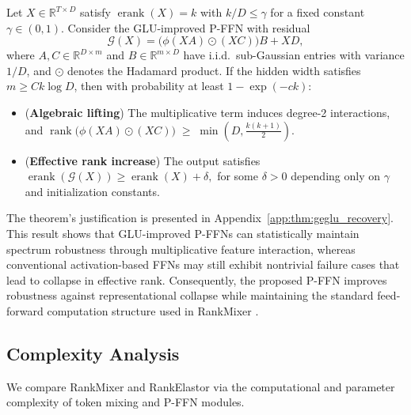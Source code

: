 \documentclass[sigconf,screen]{acmart}
\newcommand{\unimixer}{RankElastor }
\newcommand{\rankmixer}{RankMixer }
\begin{document}
\begin{theorem}
\label{thm:geglu_recovery}
Let $X\in\mathbb R^{T\times D}$ satisfy $\operatorname{erank}(X)=k$ with $k/D\le \gamma$ for a fixed constant $\gamma\in(0,1)$.  
Consider the GLU-improved P-FFN with residual
\[
\mathcal G(X)=\big(\phi(XA)\odot(XC)\big)B + XD,
\]
where $A,C\in\mathbb R^{D\times m}$ and $B\in\mathbb R^{m\times D}$ have i.i.d.\ sub-Gaussian entries with variance $1/D$, and $\odot$ denotes the Hadamard product. 
If the hidden width satisfies $m \ge C k\log D$, then with probability at least $1-\exp(-c k)$:
\begin{itemize}[leftmargin=15pt,parsep=2pt,itemsep=2pt,topsep=2pt]
    \item (\textbf{Algebraic lifting})  
    The multiplicative term induces degree-2 interactions, and
    \(
    \operatorname{rank}\!\big(\phi(XA)\odot(XC)\big)\;\ge\;\min\!\left(D,\frac{k(k+1)}{2}\right).
    \)
    \item (\textbf{Effective rank increase})  
    The output satisfies
    \(
    \operatorname{erank}(\mathcal G(X)) \ge \operatorname{erank}(X) + \delta,
    \)
    for some $\delta>0$ depending only on $\gamma$ and initialization constants.
\end{itemize}
\end{theorem}

The theorem's justification is presented in Appendix~\ref{app:thm:geglu_recovery}. 
This result shows that GLU-improved P-FFNs can statistically maintain spectrum robustness through multiplicative feature interaction, whereas conventional activation-based FFNs may still exhibit nontrivial failure cases that lead to collapse in effective rank. 
Consequently, the proposed P-FFN improves robustness against representational collapse while maintaining the standard feed-forward computation structure used in \rankmixer.



\subsection{Complexity Analysis}\label{sec:method:complexity}
We compare \rankmixer and \unimixer via the computational and parameter complexity of token mixing and P-FFN modules.
\end{document}
